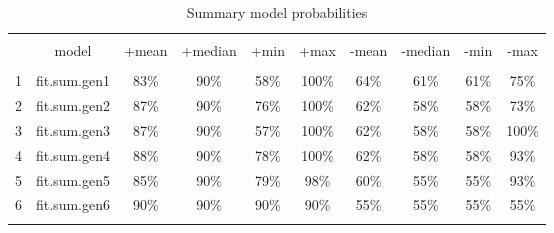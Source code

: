 \documentclass[a4paper,11pt]{article}
\begin{document}
\begin{table}[!htbp] \centering 
  \caption{Summary model probabilities} 
  \label{} 
\small 
\begin{tabular}{@{\extracolsep{1p}} cccccccccc} 
\\[-1.8ex]\hline 
\hline \\[-1.8ex] 
 & model & +mean & +median & +min & +max & -mean & -median & -min & -max \\ 
\hline \\[-1.8ex] 
1 & fit.sum.gen1 & 83\% & 90\% & 58\% & 100\% & 64\% & 61\% & 61\% & 75\% \\ 
2 & fit.sum.gen2 & 87\% & 90\% & 76\% & 100\% & 62\% & 58\% & 58\% & 73\% \\ 
3 & fit.sum.gen3 & 87\% & 90\% & 57\% & 100\% & 62\% & 58\% & 58\% & 100\% \\ 
4 & fit.sum.gen4 & 88\% & 90\% & 78\% & 100\% & 62\% & 58\% & 58\% & 93\% \\ 
5 & fit.sum.gen5 & 85\% & 90\% & 79\% & 98\% & 60\% & 55\% & 55\% & 93\% \\ 
6 & fit.sum.gen6 & 90\% & 90\% & 90\% & 90\% & 55\% & 55\% & 55\% & 55\% \\ 
\hline \\[-1.8ex] 
\end{tabular} 
\end{table} 
% 
% 
\end{document}
